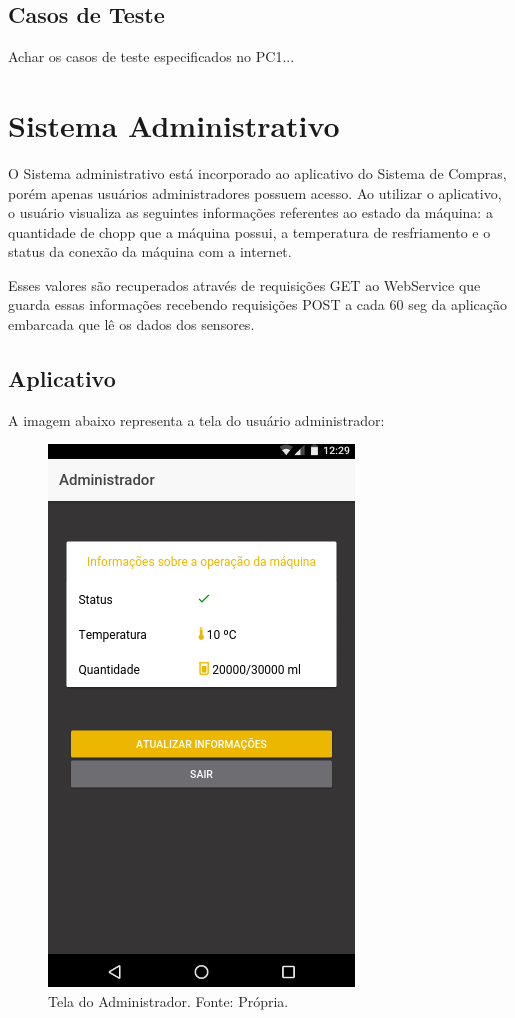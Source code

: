 \subsection{Casos de Teste}

Achar os casos de teste especificados no PC1...

\section[Sistema Administrativo]{Sistema Administrativo}

O Sistema administrativo está incorporado ao aplicativo do Sistema de Compras, porém apenas usuários
administradores possuem acesso. Ao utilizar o aplicativo, o usuário visualiza
as seguintes informações referentes ao estado da máquina: a quantidade de chopp que a
máquina possui, a temperatura de resfriamento e o status da conexão da máquina com a internet.

Esses valores são recuperados através de requisições GET ao WebService que guarda essas informações recebendo
requisições POST a cada 60 seg da aplicação embarcada que lê os dados dos sensores. 

\subsection{Aplicativo}

A imagem abaixo representa a tela do usuário administrador:

\begin{figure}[!htb]
    \centering
    \includegraphics[scale= 0.4]{figuras/Aplicativo/admin.png}        
    \caption{Tela do Administrador. Fonte: Própria.}    
    \label{home-page}
\end{figure}


